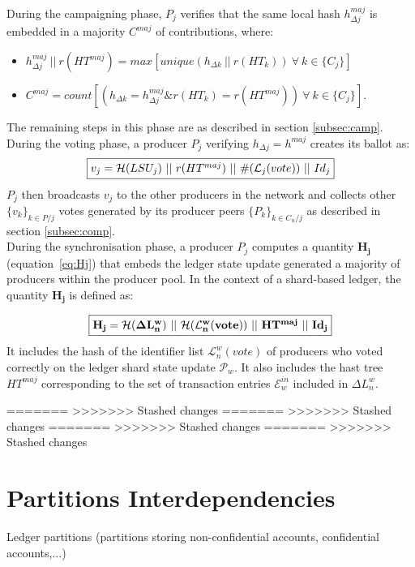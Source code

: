 During the campaigning phase, $P_j$ verifies that the same local hash $h^{maj}_{\Delta j}$ is embedded in a majority $C^{maj}$ of contributions, where:
\begin{itemize}
\item $h^{maj}_{\Delta j}~||~r(HT^{maj}) = max[unique(h_{\Delta k}~||~r(HT_k))~\forall~k\in\{C_j\}]$
\item $C^{maj} = count[(h_{\Delta k} = h^{maj}_{\Delta j} \& r(HT_k) = r(HT^{maj}))~\forall~k\in\{C_j\}]$. 
\end{itemize}

The remaining steps in this phase are as described in section \ref{subsec:camp}.\\

During the voting phase, a producer $P_j$ verifying $h_{\Delta j}=h^{maj}$ creates its ballot as:
\begin{equation}
\label{eq:vj_shard}
\fbox{$v_j = \mathcal{H}(LSU_j)~||~r(HT^{maj})~||~\#(\mathcal{L}_j(vote))~||~Id_j$}
\end{equation}
$P_j$ then broadcasts $v_j$ to the other producers in the network and collects other $\{v_k\}_{k \in P/j}$ votes generated by its producer peers $\{P_k\}_{k \in C_n/j}$ as described in section \ref{subsec:comp}.\\

During the synchronisation phase, a producer $P_j$ computes a quantity $\mathbf{H_{j}}$ (equation~\eqref{eq:Hj}) that embeds the ledger state update generated a majority of producers within the producer pool. In the context of a shard-based ledger, the  quantity $\mathbf{H_{j}}$ is defined as:

 \begin{equation} 
\fbox{$\mathbf{H_{j} = \mathcal{H}(\Delta L^w_n)~||~\mathcal{H}(\mathcal{L}^{w}_{n}(vote))~||~HT^{maj}~||~Id_j}$}
\label{eq:Hj_shard}
\end{equation}
It includes the hash of the identifier list $\mathcal{L}^{w}_{n}(vote)$ of producers who voted correctly on the ledger shard state update $\mathcal{P}_w$.
It also includes the hast tree $HT^{maj}$ corresponding to the set of transaction entries $\mathcal{E}^{in}_w$ included in $\Delta L^w_n$. 


=======
>>>>>>> Stashed changes
=======
>>>>>>> Stashed changes
=======
>>>>>>> Stashed changes
=======
>>>>>>> Stashed changes
\section{Partitions Interdependencies}

Ledger partitions (partitions storing non-confidential accounts, confidential accounts,...)